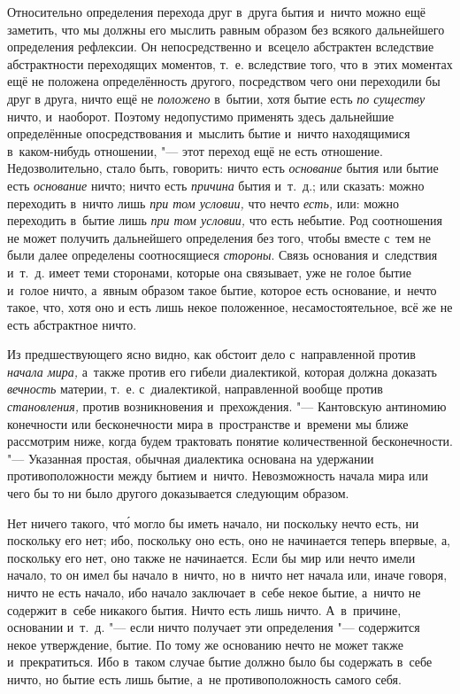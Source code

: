 Относительно определения перехода друг в~друга бытия и~ничто можно ещё
заметить, что мы должны его мыслить равным образом без всякого дальнейшего
определения рефлексии. Он непосредственно и~всецело абстрактен вследствие
абстрактности переходящих моментов, т.~е. вследствие того, что в~этих моментах
ещё не положена определённость другого, посредством чего они переходили бы друг
в друга, ничто ещё не {\em положено} в~бытии, хотя бытие есть {\em по существу}
ничто, и~наоборот. Поэтому недопустимо применять здесь дальнейшие определённые
опосредствования и~мыслить бытие и~ничто находящимися в~каком-нибудь отношении,
"--- этот переход ещё не есть отношение. Недозволительно, стало быть, говорить:
ничто есть {\em основание} бытия или бытие есть {\em основание} ничто; ничто
есть {\em причина} бытия и~т.~д.; или сказать: можно переходить в~ничто лишь
{\em при том условии,} что нечто {\em есть,} или: можно переходить в~бытие лишь
{\em при том условии,} что есть небытие. Род соотношения не может получить
дальнейшего определения без того, чтобы вместе с~тем не были далее определены
соотносящиеся {\em стороны}. Связь основания и~следствия и~т.~д. имеет теми
сторонами, которые она связывает, уже не голое бытие и~голое ничто, а~явным
образом такое бытие, которое есть основание, и~нечто такое, что, хотя оно и
есть лишь некое положенное, несамостоятельное, всё же не есть
абстрактное ничто.


Из предшествующего ясно видно, как обстоит дело с~направленной против
{\em начала мира,} а~также против его гибели диалектикой, которая должна
доказать {\em вечность} материи, т.~е. с~диалектикой, направленной вообще
против {\em становления,} против возникновения и~прехождения. "--- Кантовскую
антиномию конечности или бесконечности мира в~пространстве и~времени мы ближе
рассмотрим ниже, когда будем трактовать понятие количественной бесконечности.
"--- Указанная простая, обычная диалектика основана на удержании
противоположности между бытием и~ничто. Невозможность начала мира или чего бы
то ни было другого доказывается следующим образом.

Нет ничего такого, чт\'{о} могло бы иметь начало, ни поскольку нечто есть, ни
поскольку его нет; ибо, поскольку оно есть, оно не начинается теперь впервые,
а, поскольку его нет, оно также не начинается. Если бы мир или нечто имели
начало, то он имел бы начало в~ничто, но в~ничто нет начала или, иначе говоря,
ничто не есть начало, ибо начало заключает в~себе некое бытие, а~ничто не
содержит в~себе никакого бытия. Ничто есть лишь ничто. А~в~причине, основании
и~т.~д. "--- если ничто получает эти определения "--- содержится некое
утверждение, бытие. По тому же основанию нечто не может также и~прекратиться.
Ибо в~таком случае бытие должно было бы содержать в~себе ничто, но бытие есть
лишь бытие, а~не противоположность самого себя.

